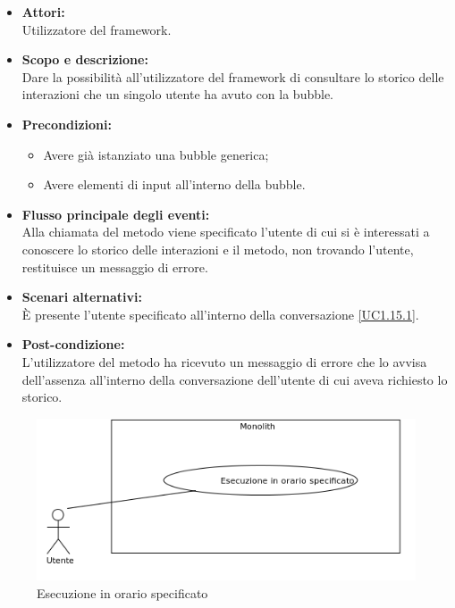 \begin{itemize}
	\item \textbf{Attori:}
	\\Utilizzatore del framework.
	\item \textbf{Scopo e descrizione:} 
	\\Dare la possibilità all'utilizzatore del framework di consultare lo storico delle interazioni che un singolo utente ha avuto con la bubble.
	\item \textbf{Precondizioni:}
	\begin{itemize}
		\item Avere già istanziato una bubble generica;
		\item Avere elementi di input all'interno della bubble.
	\end{itemize}
	\item \textbf{Flusso principale degli eventi:}
	\\Alla chiamata del metodo viene specificato l'utente di cui si è interessati a conoscere lo storico delle interazioni e il metodo, non trovando l'utente, restituisce un messaggio di errore.
	\item \textbf{Scenari alternativi:}
	\\È presente l'utente specificato all'interno della conversazione \ref{UC1.15.1}.
	\item \textbf{Post-condizione:}
	\\L'utilizzatore del metodo ha ricevuto un messaggio di errore che lo avvisa dell'assenza all'interno della conversazione dell'utente di cui aveva richiesto lo storico.
\end{itemize}


\begin{figure}[H]
	\centering
	\includegraphics[width=15cm]{../../documenti/AnalisiDeiRequisiti/Diagrammi_img/uc1_16.png}
	\caption{\UCCaption{} Esecuzione in orario specificato}
\end{figure}

